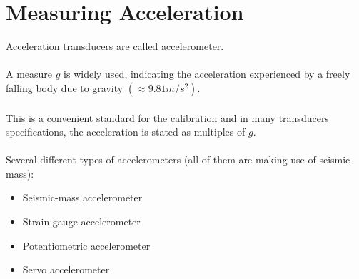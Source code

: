 \documentclass[class=report, crop=false, 12pt,a4paper]{standalone}
\begin{document}
\section{Measuring Acceleration}
Acceleration transducers are called accelerometer. \\\\
A measure $g$ is widely used, indicating the acceleration experienced by a freely falling body due to gravity $(\approx 9.81 m/s^2)$. \\\\
This is a convenient standard for the calibration and in many transducers specifications, the acceleration is stated as multiples of $g$. \\\\
Several different types of accelerometers (all of them are making use of seismic-mass):
\begin{itemize}
  \item Seismic-mass accelerometer
  \item Strain-gauge accelerometer
  \item Potentiometric accelerometer
  \item Servo accelerometer
\end{itemize}
\end{document}
